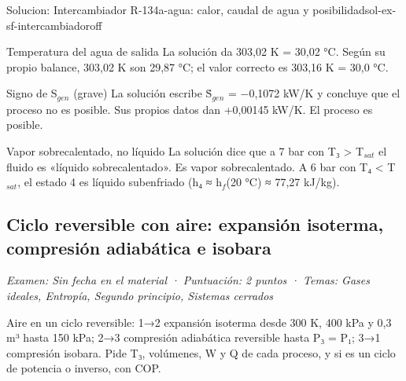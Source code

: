 \documentclass[11pt,a4paper]{article}
\begin{document}
\begin{ocg}{Solucion: Intercambiador R-134a-agua: calor, caudal de agua y posibilidad}{sol-ex-sf-intercambiador}{off}
\begin{ojobox}{Temperatura del agua de salida}
La solución da 303,02 K = 30,02 °C. Según su propio balance, 303,02 K son 29,87 °C; el valor correcto es 303,16 K = 30,0 °C.
\end{ojobox}

\begin{ojobox}{Signo de S$_{gen}$ (grave)}
La solución escribe Ṡ$_{gen}$ = −0,1072 kW/K y concluye que el proceso no es posible. Sus propios datos dan +0,00145 kW/K. El proceso es posible.
\end{ojobox}

\begin{ojobox}{Vapor sobrecalentado, no líquido}
La solución dice que a 7 bar con T₃ > T$_{sat}$ el fluido es «líquido sobrecalentado». Es vapor sobrecalentado. A 6 bar con T₄ < T$_{sat}$, el estado 4 es líquido subenfriado (h₄ ≈ h$_{f}$(20 °C) ≈ 77,27 kJ/kg).
\end{ojobox}

\hspace{0pt}\end{ocg}

\subsection{Ciclo reversible con aire: expansión isoterma, compresión adiabática e isobara}
\noindent\textit{Examen: Sin fecha en el material · Puntuación: 2 puntos · Temas: Gases ideales, Entropía, Segundo principio, Sistemas cerrados}\par\medskip

Aire en un ciclo reversible: 1→2 expansión isoterma desde 300 K, 400 kPa y 0,3 m³ hasta 150 kPa; 2→3 compresión adiabática reversible hasta P₃ = P₁; 3→1 compresión isobara. Pide T₃, volúmenes, W y Q de cada proceso, y si es un ciclo de potencia o inverso, con COP.
\end{document}
